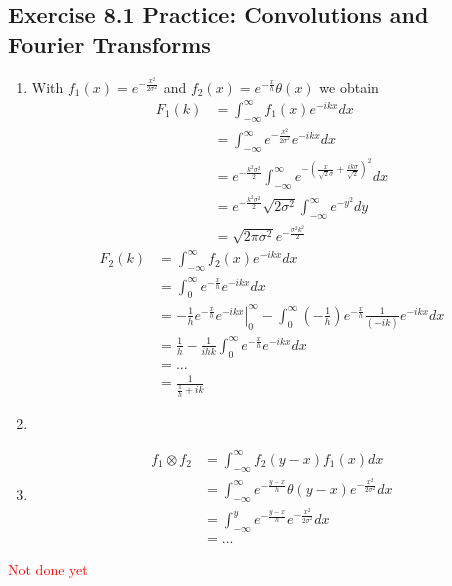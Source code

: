 \documentclass[../main.tex]{subfiles}
\begin{document}
\subsection{Exercise 8.1 Practice: Convolutions and Fourier Transforms}
\begin{enumerate}[label=(\alph*)]
\item With $f_1(x)=e^{-\frac{x^2}{2\sigma^2}}$ and $f_2(x)=e^{-\frac{x}{h}}\theta(x)$ we obtain
\begin{align}
    F_1(k)&=\int_{-\infty}^\infty f_1(x)e^{-ikx}dx\\
    &=\int_{-\infty}^\infty e^{-\frac{x^2}{2\sigma^2}}e^{-ikx}dx\\
    &=e^{-\frac{k^2\sigma^2}{2}}\int_{-\infty}^\infty e^{-\left(\frac{x}{\sqrt{2}\sigma}+\frac{ik\sigma}{\sqrt{2}}\right)^2}dx\\
    &=e^{-\frac{k^2\sigma^2}{2}} \sqrt{2\sigma^2} \int_{-\infty}^\infty e^{-y^2}dy\\
    &=\sqrt{2\pi\sigma^2}e^{-\frac{\sigma^2k^2}{2}}
\end{align}
\begin{align}
   F_2(k)&=\int_{-\infty}^\infty f_2(x)e^{-ikx}dx\\
    &=\int_{0}^\infty e^{-\frac{x}{h}}e^{-ikx}dx\\
    &=-\frac{1}{h}\left.e^{-\frac{x}{h}}e^{-ikx}\right|_0^\infty -\int_{0}^\infty \left(-\frac{1}{h}\right)e^{-\frac{x}{h}}\frac{1}{(-ik)}e^{-ikx}dx\\
    &=\frac{1}{h} -\frac{1}{ihk}\int_{0}^\infty e^{-\frac{x}{h}}e^{-ikx}dx\\
    &= ...\\
    &=\frac{1}{\frac{1}{h}+ik}
\end{align}
\item
\item
\begin{align}
    f_1\otimes f_2
    &=\int_{-\infty}^\infty f_2(y-x)f_1(x)dx\\
    &=\int_{-\infty}^\infty e^{-\frac{y-x}{h}}\theta(y-x)e^{-\frac{x^2}{2\sigma^2}}dx\\
    &=\int_{-\infty}^y e^{-\frac{y-x}{h}}e^{-\frac{x^2}{2\sigma^2}}dx\\
    &=...
\end{align}
\end{enumerate}
\textcolor{red}{Not done yet}
\end{document}
